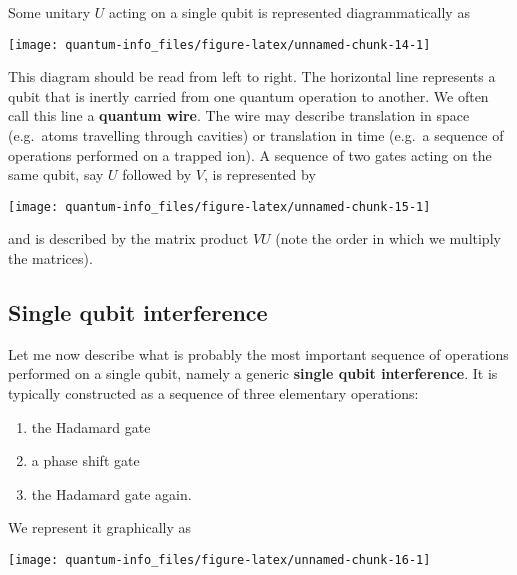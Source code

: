 \documentclass{article}
\providecommand{\tightlist}{%
  \setlength{\itemsep}{0pt}\setlength{\parskip}{0pt}}
\begin{document}
Some unitary \(U\) acting on a single qubit is represented diagrammatically as

\begin{center}\texttt{[image: quantum-info\_files/figure-latex/unnamed-chunk-14-1]} \end{center}

This diagram should be read from left to right.
The horizontal line represents a qubit that is inertly carried from one quantum operation to another.
We often call this line a \textbf{quantum wire}.
The wire may describe translation in space (e.g.~atoms travelling through cavities) or translation in time (e.g.~a sequence of operations performed on a trapped ion).
A sequence of two gates acting on the same qubit, say \(U\) followed by \(V\), is represented by

\begin{center}\texttt{[image: quantum-info\_files/figure-latex/unnamed-chunk-15-1]} \end{center}

and is described by the matrix product \(VU\) (note the order in which we multiply the matrices).

\hypertarget{single-qubit-interference}{%
\subsection{Single qubit interference}\label{single-qubit-interference}}

Let me now describe what is probably the most important sequence of operations performed on a single qubit, namely a generic \textbf{single qubit interference}.
It is typically constructed as a sequence of three elementary operations:

\begin{enumerate}
\def\labelenumi{\arabic{enumi}.}
\tightlist
\item
  the Hadamard gate
\item
  a phase shift gate
\item
  the Hadamard gate again.
\end{enumerate}

We represent it graphically as

\begin{center}\texttt{[image: quantum-info\_files/figure-latex/unnamed-chunk-16-1]} \end{center}
\end{document}
